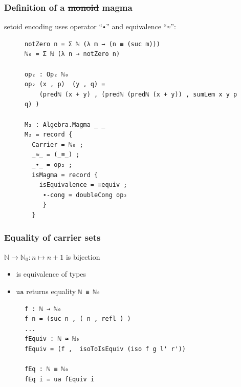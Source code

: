 \documentclass[english]{beamer}
\begin{document}
\begin{frame}[fragile]
\frametitle{Definition of a \st{monoid} magma}

setoid encoding uses operator ``\texttt{∙}'' and equivalence ``\texttt{≈}'':

\begin{figure}
\footnotesize
\begin{BVerbatim}
notZero n = Σ ℕ (λ m → (n ≡ (suc m)))
ℕ₀ = Σ ℕ (λ n → notZero n) 

op₂ : Op₂ ℕ₀
op₂ (x , p)  (y , q) = 
    (predℕ (x + y) , (predℕ (predℕ (x + y)) , sumLem x y p q) )

M₂ : Algebra.Magma _ _
M₂ = record { 
  Carrier = ℕ₀ ;
  _≈_ = (_≡_) ;
  _∙_ = op₂ ;
  isMagma = record {
    isEquivalence = ≡equiv ;
     ∙-cong = doubleCong op₂
     }
  }
\end{BVerbatim}
\end{figure}
 
\end{frame}

\begin{frame}[fragile]
\frametitle{Equality of carrier sets}

 $\mathbb{N} \rightarrow \mathbb{N}_0: n\mapsto n + 1 $ is bijection
 
 \begin{itemize}
  \item is equivalence of types
  \item $\texttt{ua}$ returns equality \texttt{ℕ ≡ ℕ₀}
 \end{itemize}
 
 
 \begin{figure}
 \begin{BVerbatim}
f : ℕ → ℕ₀ 
f n = (suc n , ( n , refl ) )
...
fEquiv : ℕ ≃ ℕ₀ 
fEquiv = (f ,  isoToIsEquiv (iso f g l' r'))

fEq : ℕ ≡ ℕ₀ 
fEq i = ua fEquiv i
 \end{BVerbatim}
\end{figure}

\end{frame}
\end{document}
